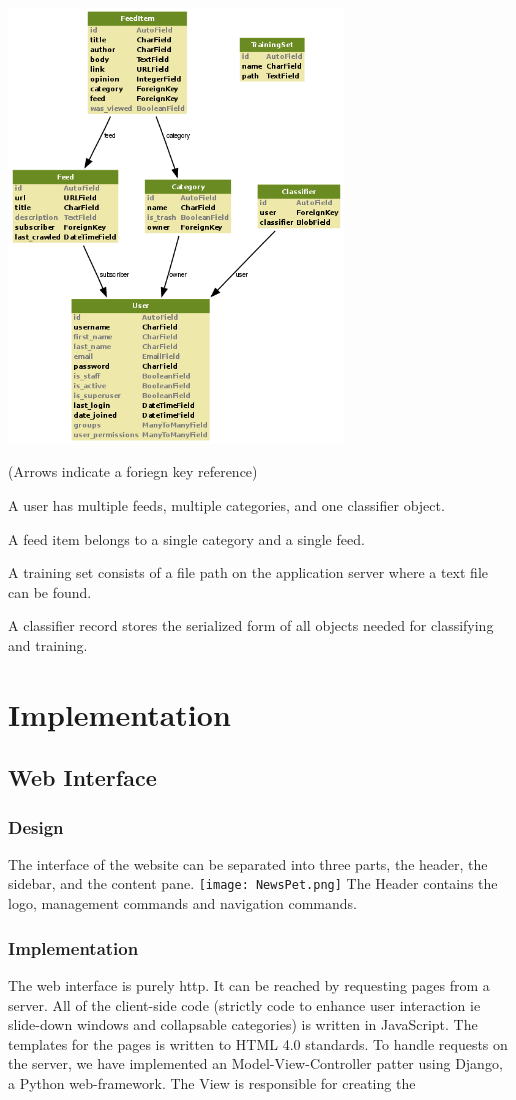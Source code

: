\documentclass[letterpaper]{article}
\begin{document}
\noindent\includegraphics[width=3.5in]{db-diagram-no-transparency.png}

(Arrows indicate a foriegn key reference)

A user has multiple feeds, multiple categories, and one classifier object.

A feed item belongs to a single category and a single feed.

A training set consists of a file path on the application server where a text file can be found.

A classifier record stores the serialized form of all objects needed for classifying and training.

\section{Implementation}
\subsection{Web Interface}

\subsubsection{Design}
The interface of the website can be separated into three parts, the header, the sidebar, and the content pane.  
\noindent\texttt{[image: NewsPet.png]}
The Header contains the logo, management commands and navigation commands. 
\subsubsection{Implementation}
The web interface is purely http.  It can be reached by requesting pages from a server.  All of the client-side code (strictly code to enhance user interaction ie slide-down windows and collapsable categories) is written in JavaScript. The templates for the pages is written to HTML 4.0 standards. To handle requests on the server, we have implemented an Model-View-Controller patter using Django, a Python web-framework.  The View is responsible for creating the 
\end{document}
